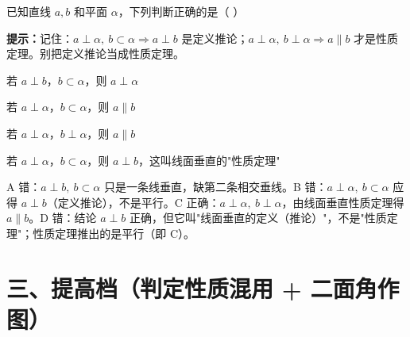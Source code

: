 \documentclass{exam-zh}
\begin{document}
\begin{question}[points=5]
  已知直线 $a,b$ 和平面 $\alpha$，下列判断正确的是（    ）
  \begin{hintbox}
\textbf{提示：}记住：$a\perp\alpha,\ b\subset\alpha\Rightarrow a\perp b$ 是定义推论；$a\perp\alpha,\ b\perp\alpha\Rightarrow a\parallel b$ 才是性质定理。别把定义推论当成性质定理。\end{hintbox}

  \begin{choices}
    \item 若 $a\perp b$，$b\subset\alpha$，则 $a\perp\alpha$
    \item 若 $a\perp\alpha$，$b\subset\alpha$，则 $a\parallel b$
    \item 若 $a\perp\alpha$，$b\perp\alpha$，则 $a\parallel b$
    \item 若 $a\perp\alpha$，$b\subset\alpha$，则 $a\perp b$，这叫线面垂直的"性质定理"
  \end{choices}
  \paren[C]
  \begin{solutionblock}
    A 错：$a\perp b,\ b\subset\alpha$ 只是一条线垂直，缺第二条相交垂线。B 错：$a\perp\alpha,\ b\subset\alpha$ 应得 $a\perp b$（定义推论），不是平行。C 正确：$a\perp\alpha,\ b\perp\alpha$，由线面垂直性质定理得 $a\parallel b$。D 错：结论 $a\perp b$ 正确，但它叫"线面垂直的定义（推论）"，不是"性质定理"；性质定理推出的是平行（即 C）。
  \end{solutionblock}
\end{question}


\section*{三、提高档（判定性质混用 + 二面角作图）}

\end{document}
